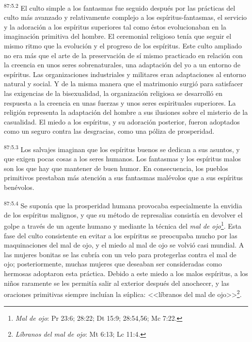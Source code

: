 \documentclass[twoside, 11pt]{book}
\begin{document}
\par
\textsuperscript{87:5.2} El culto simple a los fantasmas fue seguido después por las prácticas del culto más avanzado y relativamente complejo a los espíritus-fantasmas, el servicio y la adoración a los espíritus superiores tal como éstos evolucionaban en la imaginación primitiva del hombre. El ceremonial religioso tenía que seguir el mismo ritmo que la evolución y el progreso de los espíritus. Este culto ampliado no era más que el arte de la preservación de sí mismo practicado en relación con la creencia en unos seres sobrenaturales, una adaptación del yo a un entorno de espíritus. Las organizaciones industriales y militares eran adaptaciones al entorno natural y social. Y de la misma manera que el matrimonio surgió para satisfacer las exigencias de la bisexualidad, la organización religiosa se desarrolló en respuesta a la creencia en unas fuerzas y unos seres espirituales superiores. La religión representa la adaptación del hombre a sus ilusiones sobre el misterio de la casualidad. El miedo a los espíritus, y su adoración posterior, fueron adoptados como un seguro contra las desgracias, como una póliza de prosperidad.

\par
\textsuperscript{87:5.3} Los salvajes imaginan que los espíritus buenos se dedican a sus asuntos, y que exigen pocas cosas a los seres humanos. Los fantasmas y los espíritus malos son los que hay que mantener de buen humor. En consecuencia, los pueblos primitivos prestaban más atención a sus fantasmas malévolos que a sus espíritus benévolos.

\par
\textsuperscript{87:5.4} Se suponía que la prosperidad humana provocaba especialmente la envidia de los espíritus malignos, y que su método de represalias consistía en devolver el golpe a través de un agente humano y mediante la técnica del \textit{mal de ojo}\footnote{\textit{Mal de ojo}: Pr 23:6; 28:22; Dt 15:9; 28:54,56; Mc 7:22.}. Esta fase del culto consistente en evitar a los espíritus se preocupaba mucho por las maquinaciones del mal de ojo, y el miedo al mal de ojo se volvió casi mundial. A las mujeres bonitas se las cubría con un velo para protegerlas contra el mal de ojo; posteriormente, muchas mujeres que deseaban ser consideradas como hermosas adoptaron esta práctica. Debido a este miedo a los malos espíritus, a los niños raramente se les permitía salir al exterior después del anochecer, y las oraciones primitivas siempre incluían la súplica: <<líbranos del mal de ojo>>\footnote{\textit{Líbranos del mal de ojo}: Mt 6:13; Lc 11:4.}.
\end{document}
